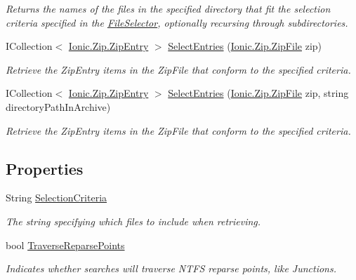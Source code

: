 \begin{DoxyCompactItemize}
\begin{DoxyCompactList}\small\item\em Returns the names of the files in the specified directory that fit the selection criteria specified in the \mbox{\hyperlink{class_super_tiled2_unity_1_1_ionic_1_1_file_selector}{File\+Selector}}, optionally recursing through subdirectories. \end{DoxyCompactList}\item 
I\+Collection$<$ \mbox{\hyperlink{class_super_tiled2_unity_1_1_ionic_1_1_zip_1_1_zip_entry}{Ionic.\+Zip.\+Zip\+Entry}} $>$ \mbox{\hyperlink{class_super_tiled2_unity_1_1_ionic_1_1_file_selector_abe158bc9314c9c3cdb511da60fcd4766}{Select\+Entries}} (\mbox{\hyperlink{class_super_tiled2_unity_1_1_ionic_1_1_zip_1_1_zip_file}{Ionic.\+Zip.\+Zip\+File}} zip)
\begin{DoxyCompactList}\small\item\em Retrieve the Zip\+Entry items in the Zip\+File that conform to the specified criteria. \end{DoxyCompactList}\item 
I\+Collection$<$ \mbox{\hyperlink{class_super_tiled2_unity_1_1_ionic_1_1_zip_1_1_zip_entry}{Ionic.\+Zip.\+Zip\+Entry}} $>$ \mbox{\hyperlink{class_super_tiled2_unity_1_1_ionic_1_1_file_selector_ab70d506c4868dac72f93573fbd5f1f92}{Select\+Entries}} (\mbox{\hyperlink{class_super_tiled2_unity_1_1_ionic_1_1_zip_1_1_zip_file}{Ionic.\+Zip.\+Zip\+File}} zip, string directory\+Path\+In\+Archive)
\begin{DoxyCompactList}\small\item\em Retrieve the Zip\+Entry items in the Zip\+File that conform to the specified criteria. \end{DoxyCompactList}\end{DoxyCompactItemize}
\subsection*{Properties}
\begin{DoxyCompactItemize}
\item 
String \mbox{\hyperlink{class_super_tiled2_unity_1_1_ionic_1_1_file_selector_a0f2d26f8fb39862f504bc0069365ff39}{Selection\+Criteria}}
\begin{DoxyCompactList}\small\item\em The string specifying which files to include when retrieving. \end{DoxyCompactList}\item 
bool \mbox{\hyperlink{class_super_tiled2_unity_1_1_ionic_1_1_file_selector_a631a7673d40a3ab092958c3d522d831d}{Traverse\+Reparse\+Points}}
\begin{DoxyCompactList}\small\item\em Indicates whether searches will traverse N\+T\+FS reparse points, like Junctions. \end{DoxyCompactList}\end{DoxyCompactItemize}


